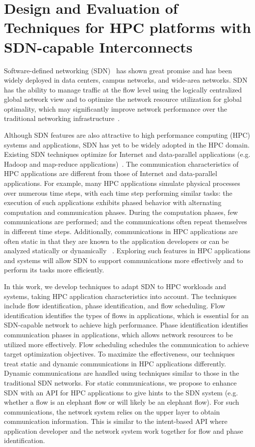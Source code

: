 \chapter{Design and Evaluation of Techniques for HPC platforms with SDN-capable Interconnects} 

Software-defined networking (SDN)~\cite{kreutz2014software} has shown great
promise and has been widely deployed in data centers, campus networks,
and wide-area networks. SDN has the ability to manage traffic at the flow
level using the logically centralized global network view and to optimize
the network resource utilization for global optimality, which may
significantly improve network performance over the traditional networking
infrastructure~\cite{tr2016sdn}.

Although SDN features are also attractive to high performance
computing (HPC) systems and applications, SDN has yet to be widely adopted
in the HPC domain. Existing SDN techniques optimize for Internet
and data-parallel applications (e.g. Hadoop and map-reduce
applications)~\cite{he2016firebird}. The communication characteristics of
HPC applications are different from those of Internet and data-parallel
applications. For example, many HPC applications simulate
physical processes over numerous time steps,
with each time step performing similar tasks: the execution of
such applications exhibits phased behavior with alternating computation
and communication phases. During the computation phases, few communications
are performed; and the communications often repeat themselves in
different time steps. Additionally,
communications in HPC applications are often static in that they are known
to the application developers or can be analyzed statically or dynamically
~\cite{faraj2002communication,hong2013achieving}. Exploring such features
in HPC applications and systems will allow SDN to support
communications more effectively and to perform its tasks more efficiently.

In this work, we develop techniques to adapt SDN to HPC workloads and systems,
taking HPC application characteristics into account. The techniques
include flow identification, phase identification, and flow scheduling.
Flow identification identifies the types of flows
in applications, which is essential
for  an SDN-capable network to achieve high performance.
Phase identification identifies communication phases in applications, which
allows network resources to be utilized more effectively. Flow scheduling
schedules the communication to achieve target optimization objectives.
To maximize the effectiveness, our techniques treat
static and dynamic communications in HPC applications differently.
Dynamic communications are handled using techniques similar to those
in the traditional SDN networks. For static communications, we propose
to enhance SDN with an API for HPC applications
to give hints to the SDN system (e.g. whether a flow is an elephant flow
or will likely be an elephant flow). For such communications,
the network system relies on the upper layer to obtain communication
information. This is similar to the intent-based API \cite{Coflow2012}
where application developer and the network system work
together for flow and phase identification.

